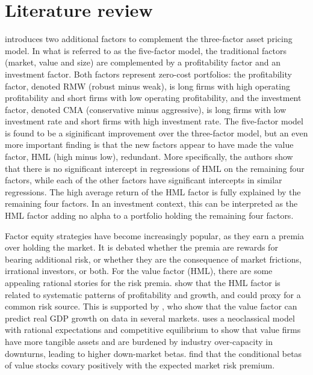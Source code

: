 \section{Literature review}
\textcite{FF2015} introduces two additional factors to complement the \textcite{FamaFrench1993} three-factor asset pricing model. In what is referred to as the five-factor model, the traditional factors (market, value and size) are complemented by a profitability factor and an investment factor. Both factors represent zero-cost portfolios: the profitability factor, denoted RMW (robust minus weak), is long firms with high operating profitability and short firms with low operating profitability, and the investment factor, denoted CMA (conservative minus aggressive), is long firms with low investment rate and short firms with high investment rate. The five-factor model is found to be a siginificant improvement over the three-factor model, but an even more important finding is that the new factors appear to have made the value factor, HML (high minus low), redundant. More specifically, the authors show that there is no significant intercept in regressions of HML on the remaining four factors, while each of the other factors have significant intercepts in similar regressions. The high average return of the HML factor is fully explained by the remaining four factors. In an investment context, this can be interpreted as the HML factor adding no alpha to a portfolio holding the remaining four factors.

Factor equity strategies have become increasingly popular, as they earn a premia over holding the market. It is debated whether the premia are rewards for bearing additional risk, or whether they are the consequence of market frictions, irrational investors, or both. For the value factor (HML), there are some appealing rational stories for the risk premia. \textcite{FamaFrench1993} show that the HML factor is related to systematic patterns of profitability and growth, and could proxy for a common risk source. This is supported by \textcite{LiewVassalou2000}, who show that the value factor can predict real GDP growth on data in several markets. \textcite{Zhang2005} uses a neoclassical model with rational expectations and competitive equilibrium to show that value firms have more tangible assets and are burdened by industry over-capacity in downturns, leading to higher down-market betas. \textcite{PetkovaZhang2005} find that the conditional betas of value stocks covary positively with the expected market risk premium.

